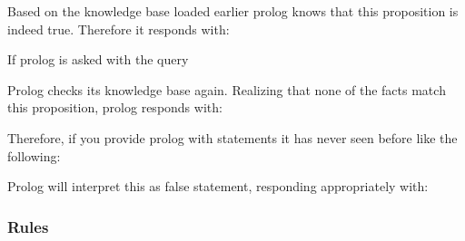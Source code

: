 \begin{Shaded}
\begin{Highlighting}[]
\end{Highlighting}
\end{Shaded}

Based on the knowledge base loaded earlier prolog knows that this
proposition is indeed true. Therefore it responds with:

\begin{Shaded}
\begin{Highlighting}[]
\end{Highlighting}
\end{Shaded}

If prolog is asked with the query

\begin{Shaded}
\begin{Highlighting}[]
\end{Highlighting}
\end{Shaded}

Prolog checks its knowledge base again. Realizing that none of the facts
match this proposition, prolog responds with:

\begin{Shaded}
\begin{Highlighting}[]
\end{Highlighting}
\end{Shaded}

Therefore, if you provide prolog with statements it has never seen
before like the following:

\begin{Shaded}
\begin{Highlighting}[]
\end{Highlighting}
\end{Shaded}

Prolog will interpret this as false statement, responding appropriately
with:

\begin{Shaded}
\begin{Highlighting}[]
\end{Highlighting}
\end{Shaded}

\subsubsection{Rules}\label{logic-programming-paradigm.md__rules}

